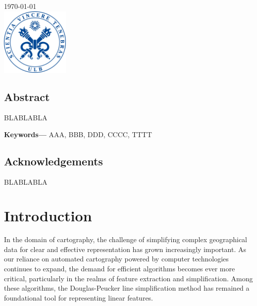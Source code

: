 \documentclass[twoside,12pt, a4paper]{report}
\providecommand{\keywords}[1]
{
  
  \textbf{Keywords---} #1
}
\begin{document}
\begin{titlepage}

{\large \today}\\[1cm] %


\includegraphics[width=3.3cm, height=3.3cm]{sceau-a-quadri.jpg}%
 

\end{titlepage}


\section*{Abstract}

BLABLABLA
\vspace{10pt}

\keywords{AAA, BBB, DDD, CCCC, TTTT}
\newpage

\section*{Acknowledgements}
BLABLABLA
\newpage


\tableofcontents

\listoffigures
\listoftables
\lstlistoflistings

\newpage

\chapter{Introduction}
In the domain of cartography, the challenge of simplifying complex geographical data for clear and effective representation has grown increasingly important. As our reliance on automated cartography powered by computer technologies continues to expand, the demand for efficient algorithms becomes ever more critical, particularly in the realms of feature extraction and simplification. Among these algorithms, the Douglas-Peucker line simplification method has remained a foundational tool for representing linear features.
\end{document}
